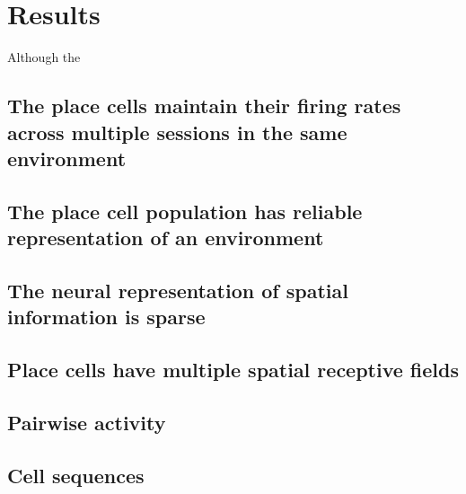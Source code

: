 \chapter{Results}
\label{results}

Although the
\section{The place cells maintain their firing rates across multiple sessions in the same environment}

\section{The place cell population has reliable representation of an environment}

\section{The neural representation of spatial information is sparse}

\section{Place cells have multiple spatial receptive fields}

\section{Pairwise activity}

\section{Cell sequences}

\section{}


